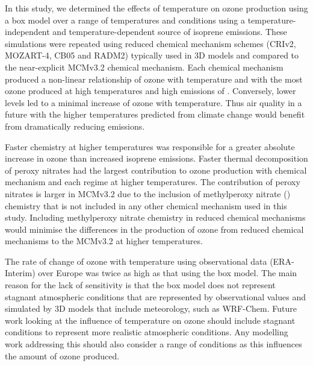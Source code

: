 In this study, we determined the effects of temperature on ozone production using a box model over a range of temperatures and  conditions using a temperature-independent and temperature-dependent source of isoprene emissions.
These simulations were repeated using reduced chemical mechanism schemes (CRIv2, MOZART-4, CB05 and RADM2) typically used in 3D models and compared to the near-explicit MCMv3.2 chemical mechanism.
Each chemical mechanism produced a non-linear relationship of ozone with temperature and  with the most ozone produced at high temperatures and high emissions of .
Conversely, lower  levels led to a minimal increase of ozone with temperature.
Thus air quality in a future with the higher temperatures predicted from climate change would benefit from dramatically reducing  emissions.

Faster chemistry at higher temperatures was responsible for a greater absolute increase in ozone than increased isoprene emissions.
Faster thermal decomposition of peroxy nitrates had the largest contribution to ozone production with chemical mechanism and each  regime at higher temperatures.
The contribution of peroxy nitrates is larger in MCMv3.2 due to the inclusion of methylperoxy nitrate () chemistry that is not included in any other chemical mechanism used in this study.
Including methylperoxy nitrate chemistry in reduced chemical mechanisms would minimise the differences in the production of ozone from reduced chemical mechanisms to the MCMv3.2 at higher temperatures.

The rate of change of ozone with temperature using observational data (ERA-Interim) over Europe was twice as high as that using the box model.
The main reason for the lack of sensitivity is that the box model does not represent stagnant atmospheric conditions that are represented by observational values and simulated by 3D models that include meteorology, such as WRF-Chem.
Future work looking at the influence of temperature on ozone should include stagnant conditions to represent more realistic atmospheric conditions.
Any modelling work addressing this should also consider a range of  conditions as this influences the amount of ozone produced.
